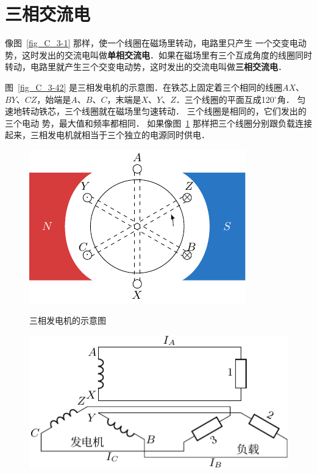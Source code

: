 	
\section{三相交流电}
像图~\ref{fig_C_3-1} 那样，使一个线圈在磁场里转动，电路里只产生
一个交变电动势，这时发出的交流电叫做\textbf{单相交流电}．如果在磁场里有三个互成角度的线圈同时转动，电路里就产生三个交变电动势，这时发出的交流电叫做\textbf{三相交流电}．


图~\ref{fig_C_3-42} 是三相发电机的示意图．在铁芯上固定着三个相同的线圈$AX$、$BY$、$CZ$，始端是$A$、$B$、$C$，末端是$X$、$Y$、$Z$．三个线圈的平面互成120$^\circ$角．
匀速地转动铁芯，三个线圈就在磁场里匀速转动．
三个线圈是相同的，它们发出的三个电动
势，最大值和频率都相同．
如果像图~\ref{fig_C_3-43} 那样把三个线圈分别跟负载连接起来，三相发电机就相当于三个独立的电源同时供电．

\begin{figure}[htbp]
	\centering
	\begin{minipage}[b]{0.48\linewidth}
		\centering
		\includegraphics{fig/C/3-42.pdf}
		\caption{三相发电机的示意图}\label{fig_C_3-42}
	\end{minipage}
	\begin{minipage}[b]{0.48\linewidth}
		\centering
		\includegraphics{fig/C/3-43.pdf}
		\caption{}\label{fig_C_3-43}
	\end{minipage}
\end{figure}


